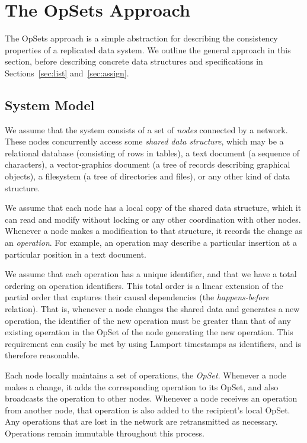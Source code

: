 \section{The OpSets Approach}\label{sec:approach}

The OpSets approach is a simple abstraction for describing the consistency properties of a replicated data system.
We outline the general approach in this section, before describing concrete data structures and specifications in Sections~\ref{sec:list} and~\ref{sec:assign}.

\subsection{System Model}\label{sec:system-model}

We assume that the system consists of a set of \emph{nodes} connected by a network.
These nodes concurrently access some \emph{shared data structure}, which may be a relational database (consisting of rows in tables), a text document (a sequence of characters), a vector-graphics document (a tree of records describing graphical objects), a filesystem (a tree of directories and files), or any other kind of data structure.

We assume that each node has a local copy of the shared data structure, which it can read and modify without locking or any other coordination with other nodes.
Whenever a node makes a modification to that structure, it records the change as an \emph{operation}.
For example, an operation may describe a particular insertion at a particular position in a text document.

We assume that each operation has a unique identifier, and that we have a total ordering on operation identifiers.
This total order is a linear extension of the partial order that captures their causal dependencies (the \emph{happens-before} relation).
That is, whenever a node changes the shared data and generates a new operation, the identifier of the new operation must be greater than that of any existing operation in the OpSet of the node generating the new operation.
This requirement can easily be met by using Lamport timestamps \cite{Lamport:1978jq} as identifiers, and is therefore reasonable.

Each node locally maintains a set of operations, the \emph{OpSet}.
Whenever a node makes a change, it adds the corresponding operation to its OpSet, and also broadcasts the operation to other nodes.
Whenever a node receives an operation from another node, that operation is also added to the recipient's local OpSet.
Any operations that are lost in the network are retransmitted as necessary.
Operations remain immutable throughout this process.

